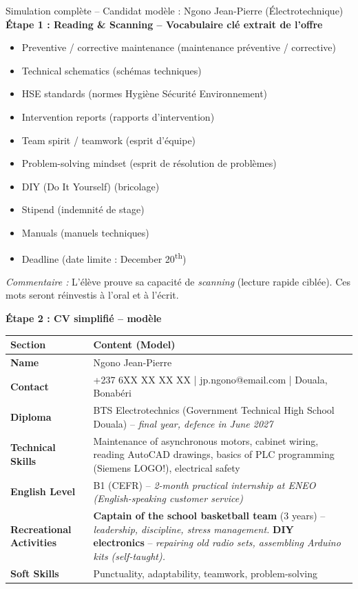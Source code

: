 \documentclass[11pt]{article}
\newcommand{\cle}[1]{{\popxbold\color{popdark}#1}}
\newcounter{popsec}
\newcounter{popsub}
\newcommand{\courssub}[1]{%
  \stepcounter{popsub}%
  \par\vspace{9pt}\noindent{\popxbold\fontsize{11.5}{13}\selectfont\color{popink}{\color{poporange}\thepopsec.\thepopsub}\hspace{6pt}#1}\par\nopagebreak\vspace{4pt}
}
\begin{document}
\courssub{Démarche et corrigé commenté}

\begin{exoresolu}{Simulation complète -- Candidat modèle : Ngono Jean-Pierre (Électrotechnique)}
\textbf{Étape 1 : Reading \& Scanning -- Vocabulaire clé extrait de l'offre}
\begin{itemize}
    \item \cle{Preventive / corrective maintenance} (maintenance préventive / corrective)
    \item \cle{Technical schematics} (schémas techniques)
    \item \cle{HSE standards} (normes Hygiène Sécurité Environnement)
    \item \cle{Intervention reports} (rapports d'intervention)
    \item \cle{Team spirit / teamwork} (esprit d'équipe)
    \item \cle{Problem-solving mindset} (esprit de résolution de problèmes)
    \item \cle{DIY (Do It Yourself)} (bricolage)
    \item \cle{Stipend} (indemnité de stage)
    \item \cle{Manuals} (manuels techniques)
    \item \cle{Deadline} (date limite : December 20\textsuperscript{th})
\end{itemize}
\textit{Commentaire :} L'élève prouve sa capacité de \emph{scanning} (lecture rapide ciblée). Ces mots seront réinvestis à l'oral et à l'écrit.

\textbf{Étape 2 : CV simplifié -- modèle}

\begin{center}
\begin{tabularx}{\linewidth}{|l|X|}\hline
\rowcolor{popblueL}
\textbf{Section} & \textbf{Content (Model)} \\ \hline
\textbf{Name} & Ngono Jean-Pierre \\ \hline
\textbf{Contact} & +237 6XX XX XX XX | jp.ngono@email.com | Douala, Bonabéri \\ \hline
\textbf{Diploma} & BTS Electrotechnics (Government Technical High School Douala) -- \textit{final year, defence in June 2027} \\ \hline
\textbf{Technical Skills} & Maintenance of asynchronous motors, cabinet wiring, reading AutoCAD drawings, basics of PLC programming (Siemens LOGO!), electrical safety \\ \hline
\textbf{English Level} & B1 (CEFR) -- \textit{2-month practical internship at ENEO (English-speaking customer service)} \\ \hline
\textbf{Recreational Activities} & \textbf{Captain of the school basketball team} (3 years) -- \textit{leadership, discipline, stress management.} \textbf{DIY electronics} -- \textit{repairing old radio sets, assembling Arduino kits (self-taught).} \\ \hline
\textbf{Soft Skills} & Punctuality, adaptability, teamwork, problem-solving \\ \hline
\end{tabularx}
\end{center}


\end{exoresolu}
\end{document}

